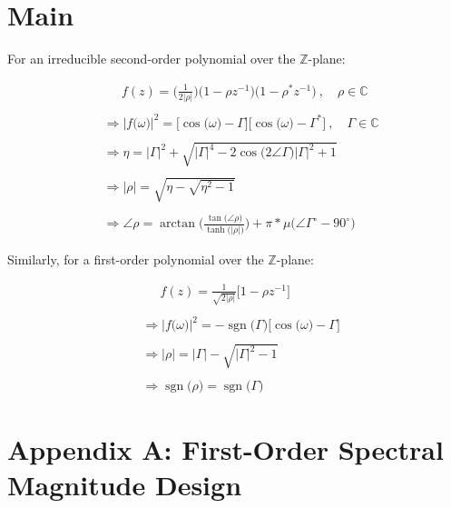 \documentclass{article}
\DeclareMathOperator{\sgn}{sgn}
\begin{document}
\section{Main}

For an irreducible second-order polynomial over the $\mathbb{Z}$-plane:

\begin{align*}
    & \quad \ \ f(z) = \bigg(\frac{1}{2\big|\rho\big|}\bigg)\big(1 - \rho z^{-1}\big)\big(1 - \rho^{*}z^{-1}\big) \ , \quad \rho \in \mathbb{C} \\ \\
    & \Rightarrow \Big|f\big(\omega\big)\Big|^{2} = \Big[\cos\big(\omega\big) - \Gamma\Big]\Big[\cos\big(\omega\big) - \Gamma^{*}\Big] \ , \quad \Gamma \in \mathbb{C} \\ \\ 
    & \Rightarrow \eta = \big|\Gamma\big|^{2} + \sqrt{\big|\Gamma\big|^{4} - 2\cos\big(2\angle{\Gamma}\big)|\Gamma|^{2} + 1} \\ \\
    & \Rightarrow \big|\rho\Big| = \sqrt{\eta - \sqrt{\eta^{2} - 1}} \\ \\
    & \Rightarrow \angle{\rho} = \arctan\Bigg( \frac{\tan\big(\angle{\rho}\big)}{\tanh\big(\big|\rho\big|\big)} \Bigg) + \pi * \mu\Big(\angle{\Gamma}^{\circ} - 90^{\circ}\Big)
  \end{align*}\newline

Similarly, for a first-order polynomial over the $\mathbb{Z}$-plane:

\begin{align*}
    & \quad \ \ f(z) = \frac{1}{\sqrt{2\big|\rho\big|}}\big[1 - \rho z^{-1}\big] \\ \\
    & \Rightarrow \Big|f\big(\omega\big)\Big|^{2} = -\sgn\big(\Gamma\big)\bigg[\cos\big(\omega\big) - \Gamma\bigg] \\ \\ 
    & \Rightarrow \big|\rho\big| = \big|\Gamma\big| - \sqrt{\big|\Gamma\big|^{2} - 1} \\ \\
    & \Rightarrow \sgn\big(\rho\big) = \sgn\big(\Gamma\big)
  \end{align*}

\newpage
\section*{Appendix A: First-Order Spectral Magnitude Design}
\end{document}
